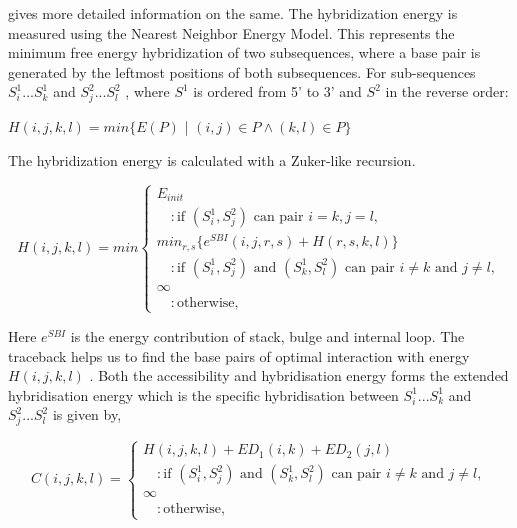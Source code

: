 \documentclass[twoside,a4paper]{report}
\begin{document}
	\citep{muckstein2006thermodynamics} gives more detailed information on the same.
	The hybridization energy is measured using the Nearest Neighbor Energy Model. This represents the minimum free energy hybridization of two subsequences, where a base pair is generated by the leftmost positions of both subsequences.
	For sub-sequences $S_i^1...S_k^1$ and  $S_j^2...S_l^2$ , where $S^1$ is ordered from 5' to 3' and $S^2$ in the reverse order:

	
		\begin{center}
		
		$H(i,j,k,l) = min \{ E(P)$ | $(i, j) \in P \land (k,l) \in P \}$
		
	\end{center}
	
	The hybridization energy is calculated with a Zuker-like recursion.
	
	\begin{equation}
	H(i,j,k,l) = min \begin{cases}
	E_{init} \\
		\quad : \text{if $(S_i^1 , S_j^2 )$ can pair $i =k , j=l $}, \\	
	min_{r,s}\{ e^{SBI}(i,j,r,s)+ H(r,s,k,l)\} \\
	 \quad 	: \text{if $(S_i^1 , S_j^2 )$ and $(S_k^1 , S_l^2)$ can pair $i \neq k $ and $j \neq l $} ,\\
	\infty \\
	\quad : \text{otherwise},
	\end{cases}
	\end{equation}
	
	Here $e^{SBI} $ is the energy contribution of stack, bulge and internal loop. The traceback helps us to find the base pairs of optimal interaction with energy $H(i,j,k,l)$ . Both the accessibility and hybridisation energy forms the extended hybridisation energy which is the specific hybridisation between $S_i^1...S_k^1$ and  $S_j^2...S_l^2$ is given by, 
	
		\begin{equation}
	C(i,j,k,l) =  \begin{cases}
	H(i, j, k , l) + ED_1(i, k) + ED_2(j, l) \\
	\quad 	: \text{if $(S_i^1 , S_j^2 )$ and $(S_k^1 , S_l^2)$ can pair $i \neq k $ and $j \neq l $} ,\\
	\infty \\
	\quad : \text{otherwise},
	\end{cases}
	\end{equation}
	
\end{document}

